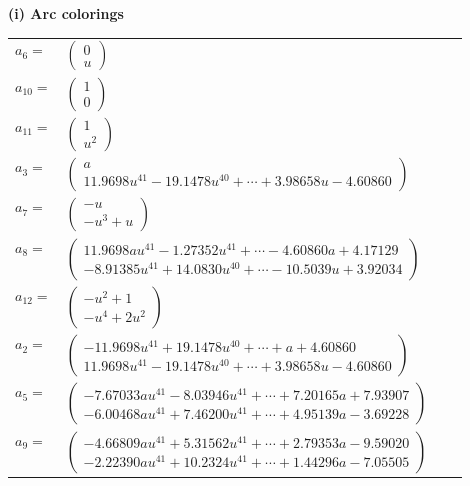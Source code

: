 \documentclass[1p]{elsarticle_modified}
\theoremstyle{definition}
\begin{document}
\flushleft \textbf{(i) Arc colorings}\\
\begin{tabular}{m{7pt} m{180pt} m{7pt} m{180pt} }
\flushright $a_{6}=$&$\begin{pmatrix}0\\u\end{pmatrix}$ \\
\flushright $a_{10}=$&$\begin{pmatrix}1\\0\end{pmatrix}$ \\
\flushright $a_{11}=$&$\begin{pmatrix}1\\u^2\end{pmatrix}$ \\
\flushright $a_{3}=$&$\begin{pmatrix}a\\11.9698 u^{41}-19.1478 u^{40}+\cdots+3.98658 u-4.60860\end{pmatrix}$ \\
\flushright $a_{7}=$&$\begin{pmatrix}- u\\- u^3+u\end{pmatrix}$ \\
\flushright $a_{8}=$&$\begin{pmatrix}11.9698 a u^{41}-1.27352 u^{41}+\cdots-4.60860 a+4.17129\\-8.91385 u^{41}+14.0830 u^{40}+\cdots-10.5039 u+3.92034\end{pmatrix}$ \\
\flushright $a_{12}=$&$\begin{pmatrix}- u^2+1\\- u^4+2 u^2\end{pmatrix}$ \\
\flushright $a_{2}=$&$\begin{pmatrix}-11.9698 u^{41}+19.1478 u^{40}+\cdots+a+4.60860\\11.9698 u^{41}-19.1478 u^{40}+\cdots+3.98658 u-4.60860\end{pmatrix}$ \\
\flushright $a_{5}=$&$\begin{pmatrix}-7.67033 a u^{41}-8.03946 u^{41}+\cdots+7.20165 a+7.93907\\-6.00468 a u^{41}+7.46200 u^{41}+\cdots+4.95139 a-3.69228\end{pmatrix}$ \\
\flushright $a_{9}=$&$\begin{pmatrix}-4.66809 a u^{41}+5.31562 u^{41}+\cdots+2.79353 a-9.59020\\-2.22390 a u^{41}+10.2324 u^{41}+\cdots+1.44296 a-7.05505\end{pmatrix}$ \\

\end{tabular}
\end{document}
